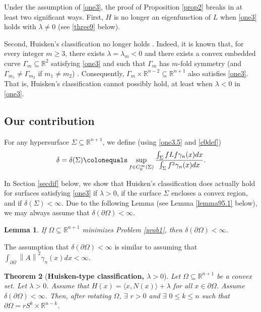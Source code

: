 \documentclass[12pt,reqno]{amsart}
\newtheorem{theorem}{Theorem}[section]
\newtheorem{lemma}[theorem]{Lemma}
\theoremstyle{definition}
\renewcommand{\subset}{\subseteq}
\newcommand{\vnormt}[1]{\left\|#1\right\|}    %
\newcommand{\R}{\mathbb{R}}
\newcommand{\embolden}[1]{\textbf {#1}}
\newcommand{\sdimn}{n}
\newcommand{\adimn}{n+1}
\newcommand{\scon}{\lambda}
\newcommand{\pcon}{\delta}
\begin{document}
Under the assumption of \eqref{one3}, the proof of Proposition \ref{prop2} breaks in at least two significant ways.  First, $H$ is no longer an eigenfunction of $L$ when \eqref{one3} holds with $\scon\neq0$ (see \eqref{three9} below).

Second, Huisken's classification no longer holds \cite{huisken90,huisken93}.  Indeed, it is known that, for every integer $m\geq3$, there exists $\scon=\scon_{m}<0$ and there exists a convex embedded curve $\Gamma_{m}\subset\R^{2}$ satisfying \eqref{one3} and such that $\Gamma_{m}$ has $m$-fold symmetry (and $\Gamma_{m_{1}}\neq\Gamma_{m_{2}}$ if $m_{1}\neq m_{2}$)  \cite[Theorem 1.3, Proposition 3.2]{chang17}.  Consequently, $\Gamma_{m}\times\R^{\sdimn-2}\subset\R^{\adimn}$ also satisfies \eqref{one3}.  That is, Huisken's classification cannot possibly hold, at least when $\scon<0$ in \eqref{one3}.

\subsection{Our contribution}


For any hypersurface $\Sigma\subset\R^{\adimn}$, we define (using \eqref{one3.5} and \eqref{c0def})
$$\pcon=\pcon(\Sigma)
\colonequals\sup_{f\in C_{0}^{\infty}(\Sigma)}\frac{\int_{\Sigma}fLf\gamma_{\sdimn}(x)dx}{\int_{\Sigma}f^{2}\gamma_{\sdimn}(x)dx}.$$

In Section \ref{secdif} below, we show that Huisken's classification does actually hold for surfaces satisfying \eqref{one3} if $\scon>0$, if the surface $\Sigma$ encloses a convex region, and if $\pcon(\Sigma)<\infty$.  Due to the following Lemma (see Lemma \ref{lemma95.1} below), we may always assume that $\pcon(\partial\Omega)<\infty$.

\begin{lemma}\label{lemma95}
If $\Omega\subset\R^{\adimn}$ minimizes Problem \ref{prob1}, then $\pcon(\partial\Omega)<\infty$.
\end{lemma}

The assumption that $\pcon(\partial\Omega)<\infty$ is similar to assuming that $\int_{\partial\Omega}\vnormt{A}^{2}\gamma_{\sdimn}(x)dx<\infty$.

\begin{theorem}[\embolden{Huisken-type classification, $\scon>0$}]\label{thm1}
Let $\Omega\subset\R^{\adimn}$ be a convex set.  Let $\scon>0$.  Assume that $H(x)=\langle x,N(x)\rangle+\scon$ for all $x\in\partial\Omega$.  Assume $\pcon(\partial\Omega)<\infty$.  Then, after rotating $\Omega$, $\exists$ $r>0$ and $\exists$ $0\leq k\leq\sdimn$ such that $\partial\Omega= r S^{k}\times\R^{\sdimn-k}$.
\end{theorem}
\end{document}
